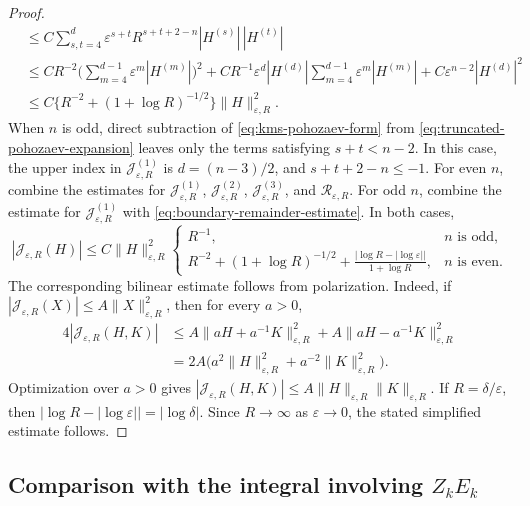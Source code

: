 \documentclass[11pt]{article}
\numberwithin{equation}{section}
\theoremstyle{remark}
\begin{document}
\begin{proof}
{\begin{equation}
\begin{aligned}
 &\le C\sum_{s,t=4}^{d}
 \varepsilon^{s+t}R^{s+t+2-n}|H^{(s)}|\,|H^{(t)}|\\
 &\le CR^{-2}\bigg(\sum_{m=4}^{d-1}\varepsilon^m|H^{(m)}|\bigg)^2
   +CR^{-1}\varepsilon^d|H^{(d)}|
      \sum_{m=4}^{d-1}\varepsilon^m|H^{(m)}|
   +C\varepsilon^{n-2}|H^{(d)}|^2\\
 &\le C\bigl\{R^{-2}+(1+\log R)^{-1/2}\bigr\}
 \|H\|_{\varepsilon,R}^2.
\end{aligned}
\end{equation}
}
When $n$ is odd, direct subtraction of
\eqref{eq:kms-pohozaev-form} from
\eqref{eq:truncated-pohozaev-expansion} leaves only the terms satisfying $s+t<n-2$.  In this case, the upper index in
$\mathcal J_{\varepsilon,R}^{(1)}$ is $d=(n-3)/2$, and
$s+t+2-n\le-1$.  For even $n$, combine the estimates for
$\mathcal J_{\varepsilon,R}^{(1)}$,
$\mathcal J_{\varepsilon,R}^{(2)}$,
$\mathcal J_{\varepsilon,R}^{(3)}$, and
 $\mathcal R_{\varepsilon,R}$.  For odd $n$, combine the estimate for
$\mathcal J_{\varepsilon,R}^{(1)}$ with
\eqref{eq:boundary-remainder-estimate}.  In both cases,
{
\begin{equation*}
 |\mathcal J_{\varepsilon,R}(H)|
 \le C\|H\|_{\varepsilon,R}^2
 \begin{cases}
  R^{-1},&n\text{ is odd},\\
  R^{-2}+(1+\log R)^{-1/2}
  +\displaystyle\frac{|\log R-|\log\varepsilon||}{1+\log R},
  &n\text{ is even}.
 \end{cases}
\end{equation*}
}
The corresponding bilinear estimate follows from polarization.  Indeed,
if $|\mathcal J_{\varepsilon,R}(X)|\le A\|X\|_{\varepsilon,R}^2$, then
for every $a>0$,
{
\[
\begin{aligned}
 4|\mathcal J_{\varepsilon,R}(H,K)|
 &\le A\|aH+a^{-1}K\|_{\varepsilon,R}^2
      +A\|aH-a^{-1}K\|_{\varepsilon,R}^2\\
 &=2A\bigl(a^2\|H\|_{\varepsilon,R}^2
          +a^{-2}\|K\|_{\varepsilon,R}^2\bigr).
\end{aligned}
\]
}
 Optimization over $a>0$ gives
$|\mathcal J_{\varepsilon,R}(H,K)|
\le A\|H\|_{\varepsilon,R}\|K\|_{\varepsilon,R}$.
If $R=\delta/\varepsilon$, then
$|\log R-|\log\varepsilon||=|\log\delta|$.  Since $R\to\infty$ as
$\varepsilon\to0$, the stated simplified estimate follows.
\endgroup
\end{proof}

\subsection*{\texorpdfstring{Comparison with the integral
involving \(Z_kE_k\)}{Comparison with the integral involving Z_kE_k}}
\end{document}
